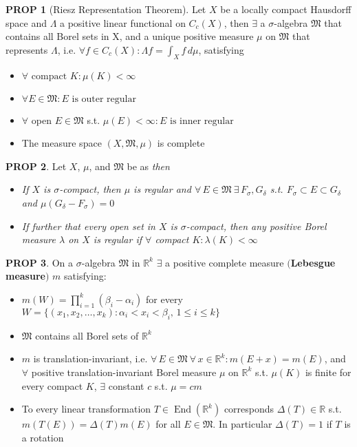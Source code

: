 \documentclass[hidelinks,10pt]{article}
\theoremstyle{definition}
\theoremstyle{dotles}
\theoremstyle{dotless}
\newtheorem{proposition}{PROP}[section]
\theoremstyle{remark}
\DeclareMathOperator{\End}{End}
\begin{document}
\begin{proposition}[Riesz Representation Theorem]\label{Prop 2.4}Let $X$ be a locally compact Hausdorff space and $\Lambda$ a positive linear functional on $C_c(X)$, then $\exists$ a $\sigma$-algebra $\mathfrak{M}$ that contains all Borel sets in X, and a unique positive measure $\mu$ on $\mathfrak{M}$ that represents $\Lambda$, i.e. $\forall f\in C_c(X):\Lambda  f=\int_Xf\,d\mu$, satisfying\begin{itemize}
    \item $\forall\textrm{ compact }K:\mu(K)<\infty$
    \item $\forall E\in\mathfrak{M}:E\textrm{ is outer regular}$
    \item $\forall$ open $E\in\mathfrak{M}$ s.t. $\mu(E)<\infty:E\textrm{ is inner regular}$
    \item The measure space $(X,\mathfrak{M},\mu)$ is complete
\end{itemize}
\end{proposition}

\begin{proposition}Let $X$, $\mu$, and $\mathfrak{M}$ be as \textit{ then}
\begin{itemize}
\item \textit{If $X$ is $\sigma$-compact, then $\mu$ is regular and $\forall\,E\in\mathfrak{M}\ \exists\,F_\sigma,G_\delta$ s.t. $F_\sigma\subset E\subset G_\delta$ and $\mu(G_\delta-F_\sigma)=0$}
\item \textit{If further that every open set in $X$ is $\sigma$-compact, then any positive Borel measure $\lambda$ on $X$ is regular if $\forall$ compact $K:\lambda(K)<\infty$}
\end{itemize}
\end{proposition}

\begin{proposition} On a $\sigma$-algebra $\mathfrak{M}$ in $\mathbb{R}^k$ $\exists$ a positive complete measure $($\textbf{Lebesgue measure}$)$ $m$ satisfying:\begin{itemize}
    \item $m(W)=\prod_{i=1}^k(\beta_i-\alpha_i)$ for every $W=\{(x_1,x_2,\dots,x_k):\alpha_i<x_i<\beta_i,\,1\leq i\leq k\}$
    \item $\mathfrak{M}$ contains all Borel sets of $\mathbb{R}^k$
    \item $m$ is translation-invariant, i.e. $\forall\,E\in\mathfrak{M}\ \forall\, x\in\mathbb{R}^k:m(E+x)=m(E)$, and $\forall$ positive translation-invariant Borel measure $\mu$ on $\mathbb{R}^k$ s.t. $\mu(K)$ is finite for every compact $K$, $\exists$ constant $c$ s.t. $\mu=cm$
    \item To every linear transformation $T\in\End(\mathbb{R}^k)$ corresponds $\Delta(T)\in\mathbb{R}$ s.t. $m(T(E))=\Delta(T)m(E)$ for all $E\in\mathfrak{M}$. In particular $\Delta(T)=1$ if $T$ is a rotation
\end{itemize}
\end{proposition}
\end{document}
